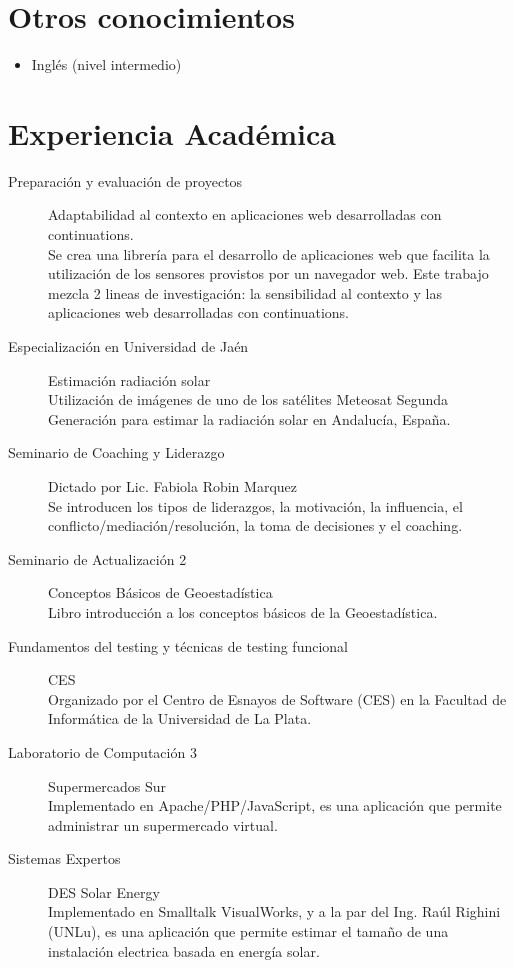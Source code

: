 \documentclass[a4paper]{article}
\begin{document}
\section{Otros conocimientos}
\begin{itemize}
\item Inglés (nivel intermedio)
\end{itemize}

\section{Experiencia Académica}
\begin{description}
\item [ Preparación y evaluación de proyectos ] Adaptabilidad al contexto en aplicaciones web desarrolladas con continuations.\\
Se crea una librería para el desarrollo de aplicaciones web que facilita la utilización de los sensores provistos por un navegador web. Este trabajo mezcla 2 lineas de investigación: la sensibilidad al contexto y las aplicaciones web desarrolladas con continuations.
\item [ Especialización en Universidad de Jaén ] Estimación radiación solar\\
Utilización de imágenes de uno de los satélites Meteosat Segunda Generación para estimar la radiación solar en Andalucía, España.
\item [ Seminario de Coaching y Liderazgo ] Dictado por Lic. Fabiola Robin Marquez\\
Se introducen los tipos de liderazgos, la motivación, la influencia, el conflicto/mediación/resolución, la toma de decisiones y el coaching.
\item [ Seminario de Actualización 2 ] Conceptos Básicos de Geoestadística\\
Libro introducción a los conceptos básicos de la Geoestadística.
\item [ Fundamentos del testing y técnicas de testing funcional ] CES\\
Organizado por el Centro de Esnayos de Software (CES) en la Facultad de Informática de la Universidad de La Plata.
\item [ Laboratorio de Computación 3 ] Supermercados Sur\\
Implementado en Apache/PHP/JavaScript, es una aplicación que permite administrar un supermercado virtual.
\item [ Sistemas Expertos ] DES Solar Energy\\
Implementado en Smalltalk VisualWorks, y a la par del Ing. Raúl Righini (UNLu),  es una aplicación que permite estimar el tamaño de una instalación electrica basada en energía solar.

\end{description}
\end{document}
